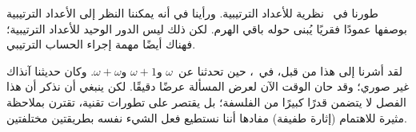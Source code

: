 \documentclass[../../../include/open-logic-section]{subfiles}
\begin{document}


طورنا في~ نظرية للأعداد الترتيبية. ورأينا في
 أنه يمكننا النظر إلى الأعداد الترتيبية بوصفها
عمودًا فقريًا يُبنى حوله باقي الهرم. لكن ذلك ليس الدور الوحيد للأعداد
الترتيبية؛ فهناك أيضًا مهمة إجراء الحساب الترتيبي.

لقد أشرنا إلى هذا من قبل، في~، حين تحدثنا
عن~$\omega$ و$\omega+1$ و$\omega+\omega$. وكان حديثنا آنذاك غير
صوري؛ وقد حان الوقت الآن لعرض المسألة عرضًا دقيقًا. لكن ينبغي أن نذكر
أن هذا الفصل لا يتضمن قدرًا كبيرًا من الفلسفة؛ بل يقتصر على تطورات
تقنية، تقترن بملاحظة مثيرة للاهتمام (إثارة طفيفة) مفادها أننا نستطيع
فعل الشيء نفسه بطريقتين مختلفتين.
\end{document}

